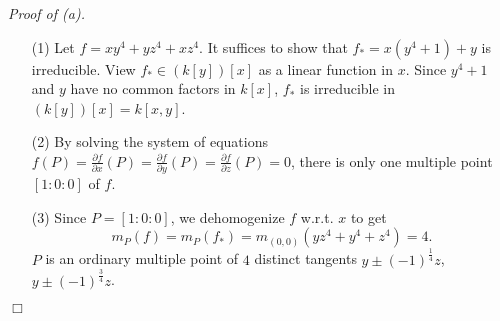 \documentclass{article}
\begin{document}
\emph{Proof of (a).}
\begin{enumerate}
\item[(1)]
  Let $f = xy^4 + yz^4 + xz^4$.
  It suffices to show that $f_{*} = x(y^4+1) + y$ is irreducible.
  View $f_{*} \in (k[y])[x]$ as a linear function in $x$.
  Since $y^4+1$ and $y$ have no common factors in $k[x]$,
  $f_{*}$ is irreducible in $(k[y])[x] = k[x,y]$.

\item[(2)]
  By solving the system of equations
  $f(P)
  = \frac{\partial f}{\partial x}(P)
  = \frac{\partial f}{\partial y}(P)
  = \frac{\partial f}{\partial z}(P) = 0$,
  there is only one multiple point $[1:0:0]$ of $f$.

\item[(3)]
  Since $P = [1:0:0]$, we dehomogenize $f$ w.r.t. $x$ to get
  \[
    m_P(f) = m_P(f_{*}) = m_{(0,0)}(yz^4 + y^4 + z^4) = 4.
  \]
  $P$ is an ordinary multiple point of $4$ distinct tangents
  $y \pm (-1)^{\frac{1}{4}}z$, $y \pm (-1)^{\frac{3}{4}}z$.
\end{enumerate}
$\Box$ \\
\end{document}
